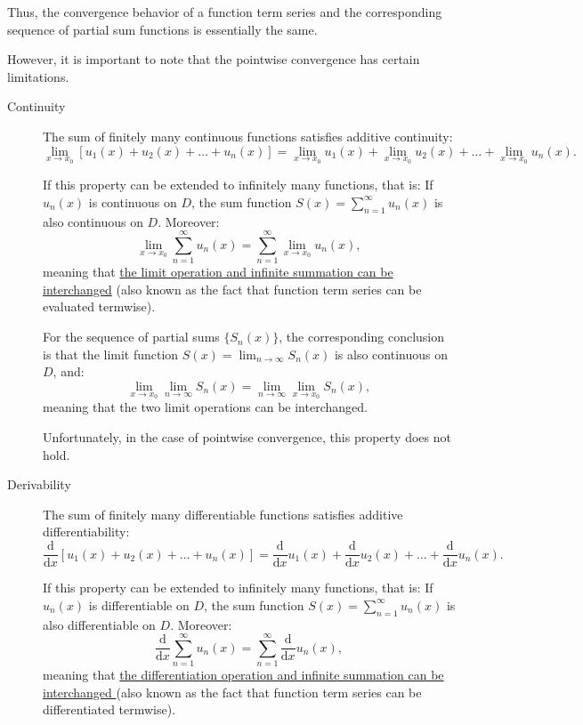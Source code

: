 \documentclass[11pt]{../../TexTemplate/elegantbook}
\begin{document}
Thus, the convergence behavior of a function term series and the corresponding sequence 
of partial sum functions is essentially the same.

However, it is important to note that the pointwise convergence has certain limitations.

\begin{description}
    \item[Continuity]
    The sum of finitely many continuous functions satisfies additive continuity:
    \[
    \lim_{x \to x_0} [u_1(x) + u_2(x) + \dots + u_n(x)] 
    = \lim_{x \to x_0} u_1(x) + \lim_{x \to x_0} u_2(x) + \dots + \lim_{x \to x_0} u_n(x).
    \]

    If this property can be extended to infinitely many functions, that is:
    If \( u_n(x) \) is continuous on \( D \), the sum function \( S(x) = \sum_{n=1}^\infty u_n(x) \) 
    is also continuous on \( D \). Moreover:
    \[
    \lim_{x \to x_0} \sum_{n=1}^\infty u_n(x) = \sum_{n=1}^\infty \lim_{x \to x_0} u_n(x),
    \]
    meaning that \underline{the limit operation and infinite summation can be interchanged}
    (also known as the fact that function term series can be evaluated termwise).

    For the sequence of partial sums \( \{ S_n(x) \} \), 
    the corresponding conclusion is that the limit function 
    \( S(x) = \lim_{n \to \infty} S_n(x) \) is also continuous on \( D \), and:
    \[
    \lim_{x \to x_0} \lim_{n \to \infty} S_n(x) = \lim_{n \to \infty} \lim_{x \to x_0} S_n(x),
    \]
    meaning that the two limit operations can be interchanged.

    Unfortunately, in the case of pointwise convergence, this property \textcolor{red!70}{does not hold}.

    \item[Derivability]
    The sum of finitely many differentiable functions satisfies additive differentiability:
    \[
    \frac{\mathrm{d}}{\mathrm{d}x} [u_1(x) + u_2(x) + \dots + u_n(x)] 
    = \frac{\mathrm{d}}{\mathrm{d}x} u_1(x) + \frac{\mathrm{d}}{\mathrm{d}x} u_2(x) + \dots + \frac{\mathrm{d}}{\mathrm{d}x} u_n(x).
    \]

    If this property can be extended to infinitely many functions, that is:
    If \( u_n(x) \) is differentiable on \( D \), 
    the sum function \( S(x) = \sum_{n=1}^\infty u_n(x) \) is also differentiable on \( D \). Moreover:
    \[
    \frac{\mathrm{d}}{\mathrm{d}x} \sum_{n=1}^\infty u_n(x) = \sum_{n=1}^\infty \frac{\mathrm{d}}{\mathrm{d}x} u_n(x),
    \]
    meaning that \underline{the differentiation operation and infinite summation can be interchanged }
    (also known as the fact that function term series can be differentiated termwise).


\end{description}
\end{document}
